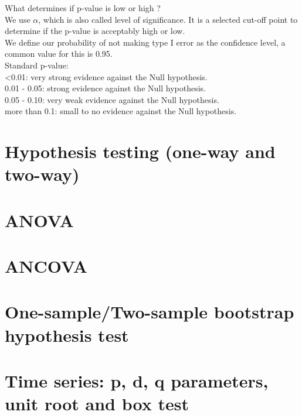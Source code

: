 What determines if p-value is low or high ?\\
We use $\alpha$, which is also called level of significance. It is a selected cut-off point to determine if the p-value is acceptably high or low.\\

We define our probability of not making type I error as the confidence level, a common value for this is 0.95.\\

Standard p-value:\\
<0.01: very strong evidence against the Null hypothesis.\\
0.01 - 0.05: strong evidence against the Null hypothesis.\\
0.05 - 0.10: very weak evidence against the Null hypothesis. \\
more than 0.1: small to no evidence against the Null hypothesis. \\


\section{Hypothesis testing (one-way and two-way)}

\section{ANOVA}

\section{ANCOVA}

\section{One-sample/Two-sample bootstrap hypothesis test}

\section{Time series: p, d, q parameters, unit root and box test}



